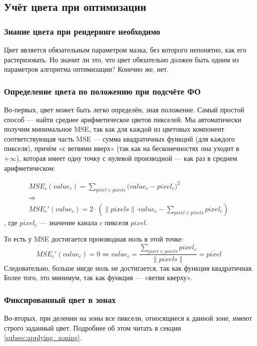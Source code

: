 \subsection{Учёт цвета при оптимизации}\label{subsec:color_in_genome}

\subsubsection{Знание цвета при рендеринге необходимо}
Цвет является обязательным параметром мазка, без которого непонятно, как его растеризовать.
Но значит ли это, что цвет обязательно должен быть одним из параметров алгоритма оптимизации?
Конечно же, нет.

\subsubsection{Определение цвета по положению при подсчёте ФО}
Во-первых, цвет может быть легко определён, зная положение.
Самый простой способ — найти среднее арифметическое цветов пикселей.
Мы автоматически получим минимальное MSE,
так как для каждой из цветовых компонент соответствующая часть MSE — сумма квадратичных функций (для каждого пикселя),
причём «с ветвями вверх» (так как на бесконечностях она уходит в $+ \infty$), которая имеет одну точку с нулевой производной — как раз в среднем арифметическом:

\begin{equation}
    \begin{gathered}
        MSE_c(value_c) = \sum_{pixel \in {pixels}} \bigg(value_c - pixel_c\bigg)^2 \\
        \Rightarrow \\
        MSE_c'(value_c) = 2 \cdot \left( \lVert pixels \lVert \cdot value_c - \sum_{pixel \in {pixels}}  pixel_c \right)
    \end{gathered}
\end{equation}
, где $pixel_c$ — значение канала $c$ пикселя $pixel$.

То есть у MSE достигается производная ноль в этой точке:
\begin{equation}
    MSE_c'(value_c) = 0
    \Longleftrightarrow
    value_c = \frac{\sum_{pixel \in {pixels}}  pixel_c}{\lVert pixels \lVert} = \overline{pixel}
\end{equation}
Следовательно, больше нигде ноль не достигается, так как функция квадратичная.
Более того, это минимум, так как функция — «ветви кверху».

\subsubsection{Фиксированный цвет в зонах}
Во-вторых, при делении на зоны все пиксели, относящиеся к данной зоне, имеют строго заданный цвет.
Подробнее об этом читать в секции \ref{subsec:applying_zoning}.


